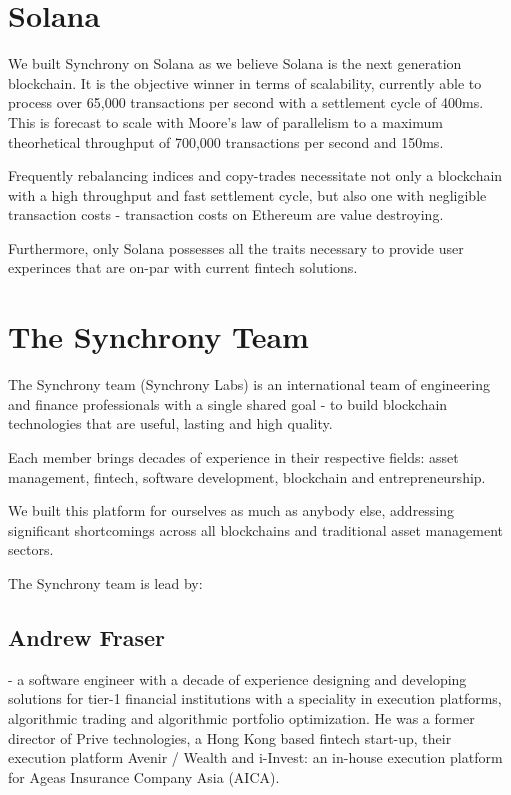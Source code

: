 \documentclass[10pt]{article}
\begin{document}
					\section{Solana}
					We built Synchrony on Solana as we believe Solana is the next generation
					blockchain. It is the objective winner in terms of scalability, currently able
					to process over 65,000 transactions per second with a settlement cycle of 400ms.
					This is forecast to scale with Moore's law of parallelism to a maximum
					theorhetical throughput of 700,000 transactions per second and 150ms.

					Frequently rebalancing indices and copy-trades necessitate not only a blockchain
					with a high throughput and fast settlement cycle, but also one with negligible
					transaction costs - transaction costs on Ethereum are value destroying.

					Furthermore, only Solana possesses all the traits necessary to provide user
					experinces that are on-par with current fintech solutions.

					\section{The Synchrony Team}
					The Synchrony team (Synchrony Labs) is an international team of engineering and
					finance professionals with a single shared goal - to build blockchain
					technologies that are useful, lasting and high quality.

					Each member brings decades of experience in their respective fields: asset
					management, fintech, software development, blockchain and entrepreneurship.

					We built this platform for ourselves as much as anybody else, addressing
					significant shortcomings across all blockchains and traditional asset management
					sectors.
					\vspace{1em}

					\noindent The Synchrony team is lead by:
					\subsection{Andrew Fraser} - a software engineer with a decade of experience designing and
					developing solutions for tier-1 financial institutions with a speciality in
					execution platforms, algorithmic trading and algorithmic portfolio optimization.
					He was a former director of Prive technologies, a Hong Kong based fintech
					start-up, their execution platform Avenir / Wealth and i-Invest: an in-house
					execution platform for Ageas Insurance Company Asia (AICA).
\end{document}
